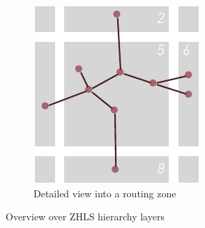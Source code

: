 \documentclass[a4paper,10pt]{scrartcl}
\begin{document}
\begin{figure}
\begin{subfigure}[b]{0.35\textwidth}
                \includegraphics[width=\textwidth]{../images/ZHLS_detail}
                \caption{Detailed view into a routing zone}
                \label{fig:zhls_detail}
        \end{subfigure}
        \caption{Overview over ZHLS hierarchy layers}
        \label{fig:zrp}
\end{figure}
\end{document}
